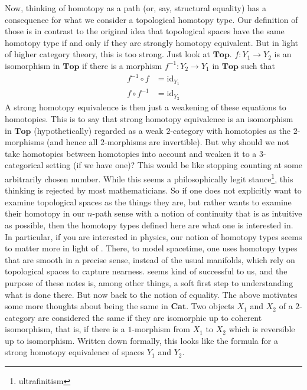 Now, thinking of homotopy as a path (or, say, structural equality) has a consequence for what we consider a topological homotopy type.
Our definition of those is in contrast to the original idea that topological spaces have the same homotopy type if and only if they are strongly homotopy equivalent.
But in light of higher category theory, this is too strong.
Just look at $\mathbf{Top}$.
$f \colon Y_{1} \rightarrow Y_{2}$ is an isomorphism in $\mathbf{Top}$ if there is a morphism $f^{-1} \colon Y_{2} \rightarrow Y_{1}$ in $\mathbf{Top}$ such that
\begin{align*}
  f^{-1}
  \circ
  f
  &=
  \mathrm{id}_{Y_{1}}
  \\
  f
  \circ
  f^{-1}
  &=
  \mathrm{id}_{Y_{2}}
\end{align*}
A strong homotopy equivalence is then just a weakening of these equations to homotopies.
This is to say that strong homotopy equivalence is an isomorphism in $\mathbf{Top}$ (hypothetically) regarded as a weak $2$-category with homotopies as the $2$-morphisms (and hence all $2$-morphisms are invertible).
But why should we not take homotopies between homotopies into account and weaken it to a $3$-categorical setting (if we have one)?
This would be like stopping counting at some arbitrarily chosen number.
While this seems a philosophically legit stance\footnote{ultrafinitism}, this thinking is rejected by most mathematicians.
So if one does not explicitly want to examine topological spaces as the things they are, but rather wants to examine their homotopy in our $n$-path sense with a notion of continuity that is as intuitive as possible, then the homotopy types defined here are what one is interested in.
In particular, if you are interested in physics, our notion of homotopy types seems to matter more in light of \cite{a565d200}.
There, to model spacetime, one uses homotopy types that are smooth in a precise sense, instead of the usual manifolds, which rely on topological spaces to capture nearness.
\cite{a565d200} seems kind of successful to us, and the purpose of these notes is, among other things, a soft first step to understanding what is done there.
But now back to the notion of equality.
The above motivates some more thoughts about {\glqq}being the same{\grqq} in $\mathbf{Cat}$.
Two objects $X_{1}$ and $X_{2}$ of a $2$-category are considered the same if they are isomorphic up to coherent isomorphism, that is, if there is a $1$-morphism from $X_{1}$ to $X_{2}$ which is reversible up to isomorphism.
Written down formally, this looks like the formula for a strong homotopy equivalence of spaces $Y_{1}$ and $Y_{2}$.
